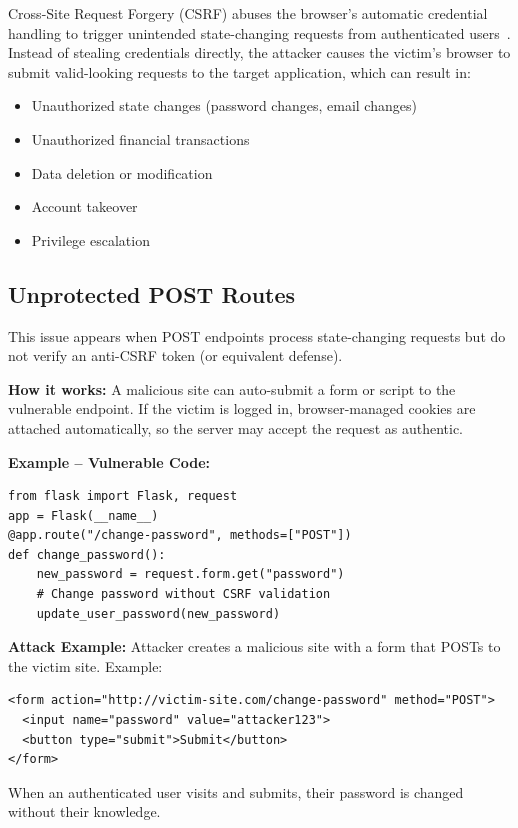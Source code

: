 Cross-Site Request Forgery (CSRF) abuses the browser's automatic credential handling to trigger unintended state-changing requests from authenticated users~\cite{OWASPTop10,OWASPCSRCheatsheet,OWASPSessionManagementCheatsheet,OWASPAuthenticationCheatsheet,CWE352,XSSRef2,MDNSameSite,RFC6265}. Instead of stealing credentials directly, the attacker causes the victim's browser to submit valid-looking requests to the target application, which can result in:
\begin{itemize}
	\item Unauthorized state changes (password changes, email changes)
	\item Unauthorized financial transactions
	\item Data deletion or modification
	\item Account takeover
	\item Privilege escalation
\end{itemize}

\subsection{Unprotected POST Routes}
\label{sec:csrf_unprotected_post}

This issue appears when POST endpoints process state-changing requests but do not verify an anti-CSRF token (or equivalent defense).

\textbf{How it works:} A malicious site can auto-submit a form or script to the vulnerable endpoint. If the victim is logged in, browser-managed cookies are attached automatically, so the server may accept the request as authentic.

\textbf{Example -- Vulnerable Code:}

\begin{lstlisting}[style=pycode]
from flask import Flask, request
app = Flask(__name__)
@app.route("/change-password", methods=["POST"])
def change_password():
    new_password = request.form.get("password")
    # Change password without CSRF validation
    update_user_password(new_password)
\end{lstlisting}

\textbf{Attack Example:} Attacker creates a malicious site with a form that POSTs to the victim site. Example:
\begin{lstlisting}[style=attackcode]
<form action="http://victim-site.com/change-password" method="POST">
  <input name="password" value="attacker123">
  <button type="submit">Submit</button>
</form>
\end{lstlisting}
When an authenticated user visits and submits, their password is changed without their knowledge.

